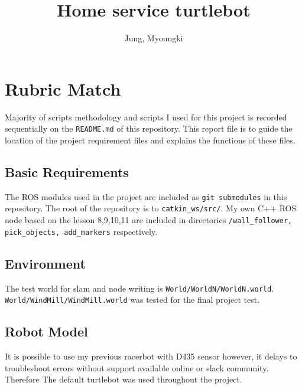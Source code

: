 \documentclass[10pt,journal,compsoc]{IEEEtran}
\begin{document}
\title{Home service turtlebot}

\author{Jung, Myoungki}

%
{}

\maketitle
\IEEEdisplaynontitleabstractindextext
\IEEEpeerreviewmaketitle

\section{Rubric Match }
Majority of scripts methodology and scripts I used for this project is recorded sequentially on the \verb!README.md! of this repository. This report file is to guide the location of the project requirement files and explains the functions of these files.
\subsection{Basic Requirements }
The ROS modules used in the project are included as \verb!git submodules! in this repository.
The root of the repository is to \verb!catkin_ws/src/!.
My own C++ ROS node based on the lesson 8,9,10,11 are included in directories \verb!/wall_follower, pick_objects, add_markers! respectively.

\subsection{Environment}
The test world for slam and node writing is \verb!World/WorldN/WorldN.world!.
\verb!World/WindMill/WindMill.world! was tested for the final project test.

\subsection{Robot Model}
It is possible to use my previous racerbot with D435 sensor however, it delays to troubleshoot errors without support available online or slack community. Therefore The default turtlebot was used throughout the project.
\end{document}
